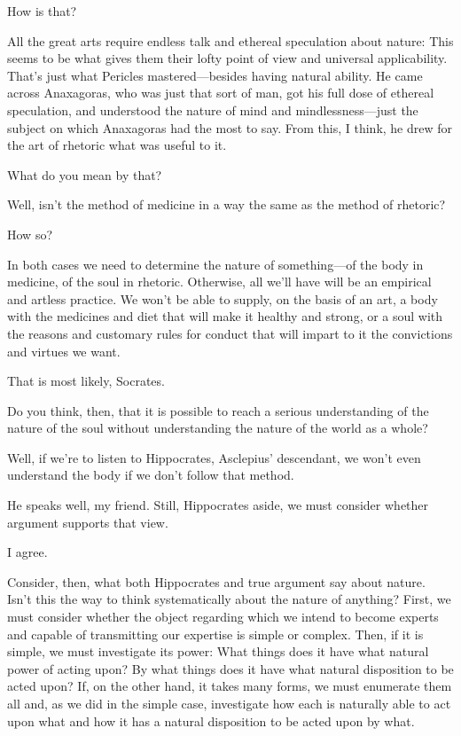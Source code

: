 \sayphaedrus How is that?

\saysocrates All the great arts require endless talk and
ethereal speculation about nature: This seems to be what gives them
their lofty point of view and universal applicability. That's just what
Pericles mastered---besides having natural ability. He came across
Anaxagoras, who was just that sort of man, got his full dose of ethereal
speculation, and understood the nature of mind and
mindlessness---just
the subject on which Anaxagoras had the most to say. From this, I think,
he drew for the art of rhetoric what was useful to it.

\sayphaedrus What do you mean by that?

\saysocrates Well, isn't the method of medicine in a way the same
as the method of rhetoric?

\sayphaedrus How so?

\saysocrates In both cases we need to determine the nature of
something---of the body in medicine, of the soul in rhetoric. Otherwise,
all we'll have will be an empirical and artless practice. We won't be
able to supply, on the basis of an art, a body with the medicines and
diet that will make it healthy and strong, or a soul with the reasons
and customary rules for conduct that will impart to it the convictions
and virtues we want.

\sayphaedrus That is most likely, Socrates.

\saysocrates Do you think, then, that it is possible to reach a serious
understanding of the nature of the soul without understanding
the nature of the world as a whole?

\sayphaedrus Well, if we're to listen to Hippocrates, Asclepius'
descendant, we won't
even understand the body if we don't follow that method.

\saysocrates He speaks well, my friend. Still, Hippocrates aside, we must
consider whether argument supports that view.

\sayphaedrus I agree.

\saysocrates Consider, then, what both Hippocrates and true argument say
about nature. Isn't this the way to think systematically about the
nature of anything? First, we must consider whether the object
regarding which we intend to become experts and capable of transmitting
our expertise is simple or complex. Then, if it is simple, we must
investigate its power: What things does it have what natural power of
acting upon? By what things does it have what natural disposition to be
acted upon? If, on the other hand, it takes many forms, we must
enumerate them all and, as we did in the simple case, investigate how
each is naturally able to act upon what and how it has a natural
disposition to be acted upon by what.

